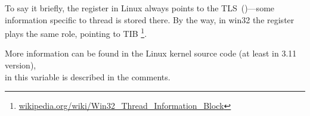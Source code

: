 To say it briefly, the  register in Linux always points to the
\ac{TLS}~()---some information specific to thread is stored there.
By the way, in win32 the  register plays the same role, pointing to
\ac{TIB} \footnote{\href{http://go.yurichev.com/17104}{wikipedia.org/wiki/Win32\_Thread\_Information\_Block}}. 

More information can be found in the Linux kernel source code (at least in 3.11 version),\\
in  this variable is described in the comments.



